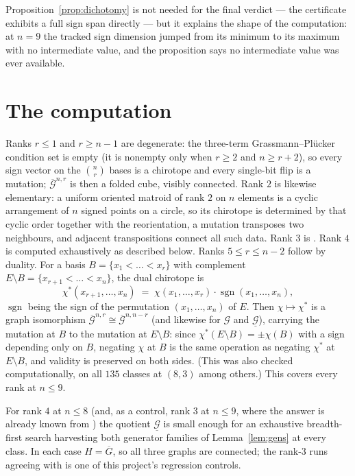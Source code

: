 \documentclass[11pt]{amsart}
\theoremstyle{remark}
\newcommand{\Gb}{\overline{\mathcal{G}}}
\newcommand{\Gm}{\mathcal{G}}
\newcommand{\Gu}{\underline{\mathcal{G}}}
\newcommand{\Gbar}{\overline{G}}
\begin{document}
Proposition~\ref{prop:dichotomy} is not needed for the final verdict ---
the certificate exhibits a full sign span directly --- but it explains
the shape of the computation: at $n=9$ the tracked sign dimension jumped
from its minimum to its maximum with no intermediate value, and the
proposition says no intermediate value was ever available.

\section{The computation}\label{sec:mass}

Ranks $r\le 1$ and $r\ge n-1$ are degenerate: the three-term
Grassmann--Pl\"ucker condition set is empty (it is nonempty only when
$r\ge2$ and $n\ge r+2$), so every sign vector on the $\binom{n}{r}$ bases
is a chirotope and every single-bit flip is a mutation; $\Gb^{n,r}$ is
then a folded cube, visibly connected. Rank $2$ is likewise elementary: a
uniform oriented matroid of rank $2$ on $n$ elements is a cyclic
arrangement of $n$ signed points on a circle, so its chirotope is
determined by that cyclic order together with the reorientation, a
mutation transposes two neighbours, and adjacent transpositions connect
all such data. Rank $3$ is \cite[Prop.~3.2]{KM23}. Rank $4$ is computed
exhaustively as described below. Ranks $5\le r\le n-2$ follow by duality. For a basis
$B=\{x_1<\dots<x_r\}$ with complement
$E\setminus B=\{x_{r+1}<\dots<x_n\}$, the dual chirotope is
\[
  \chi^*(x_{r+1},\dots,x_n)\;=\;\chi(x_1,\dots,x_r)\cdot
    \operatorname{sgn}(x_1,\dots,x_n),
\]
$\operatorname{sgn}$ being the sign of the permutation
$(x_1,\dots,x_n)$ of $E$. Then $\chi\mapsto\chi^*$ is a graph
isomorphism $\Gb^{n,r}\cong\Gb^{n,n-r}$ (and likewise for $\Gm$ and
$\Gu$), carrying the mutation at $B$ to the mutation at $E\setminus B$:
since $\chi^*(E\setminus B)=\pm\chi(B)$ with a sign depending only on
$B$, negating $\chi$ at $B$ is the same operation as negating $\chi^*$ at
$E\setminus B$, and validity is preserved on both sides. (This was also
checked computationally, on all $135$ classes at $(8,3)$ among others.)
This covers every rank at $n\le 9$.

For rank $4$ at $n\le 8$ (and, as a control, rank $3$ at $n\le 9$, where
the answer is already known from \cite[Prop.~3.2]{KM23}) the quotient
$\Gu$ is small enough for an exhaustive breadth-first search harvesting
both generator families of Lemma~\ref{lem:gens} at every class. In each
case $H=\Gbar$, so all three graphs are connected; the rank-$3$ runs
agreeing with \cite{KM23} is one of this project's regression controls.
\end{document}
